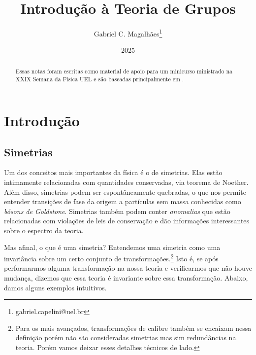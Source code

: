\documentclass{article}
\title{Introdução à Teoria de Grupos}
\author{Gabriel C. Magalhães\footnote{gabriel.capelini@uel.br}}
\date{2025}
\numberwithin{equation}{section}
\numberwithin{figure}{section}
\begin{document}
\maketitle

\begin{abstract}
Essas notas foram escritas como material de apoio para um minicurso ministrado na XXIX Semana da Física UEL e são baseadas principalmente em \cite{jakob}. 
\end{abstract}

\tableofcontents
\pagebreak

\section{Introdução}
\subsection{Simetrias}
Um dos conceitos mais importantes da física é o de simetrias. Elas estão intimamente relacionadas com quantidades conservadas, via teorema de Noether\cite{lemos2007mecânica}. Além disso, simetrias podem ser espontâneamente quebradas, o que nos permite entender transições de fase da origem a partículas sem massa conhecidas como \textit{bósons de Goldstone}\cite{Beekman_2019}. Simetrias também podem conter \textit{anomalias}\cite{Arouca_2022} que estão relacionadas com violações de leis de conservação e dão informações interessantes sobre o espectro da teoria. 


Mas afinal, o que é uma simetria? Entendemos uma simetria como uma invariância sobre um certo conjunto de transformações.\footnote{Para os mais avançados, transformações de calibre também se encaixam nessa definição porém não são consideradas simetrias mas sim redundâncias na teoria. Porém vamos deixar esses detalhes técnicos de lado.} Isto é, se após performarmos alguma transformação na nossa teoria e verificarmos que não houve mudança, dizemos que essa teoria é invariante sobre essa transformação. Abaixo, damos alguns exemplos intuitivos. 
\end{document}
